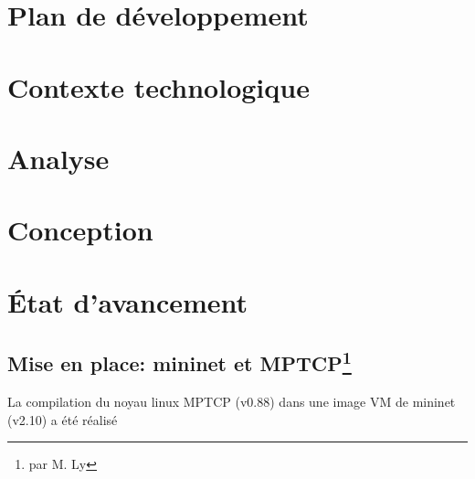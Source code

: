 \section{Plan de d\'eveloppement}
\label{sec:plan:devt}




\section{Contexte technologique}
\label{sec:etat-avancement}


\section{Analyse}
\label{sec:etat-avancement}


\section{Conception}
\label{sec:etat-avancement}


\section{\'Etat d'avancement}
\label{sec:etat-avancement}

\subsection[Mise en place: mininet et MPTCP]{Mise en place: mininet et
  MPTCP\footnote{par M. Ly}}
\label{sec:perfo:mptcp}
La compilation du noyau linux MPTCP (v0.88) dans une image VM de
mininet (v2.10) a été réalisé






